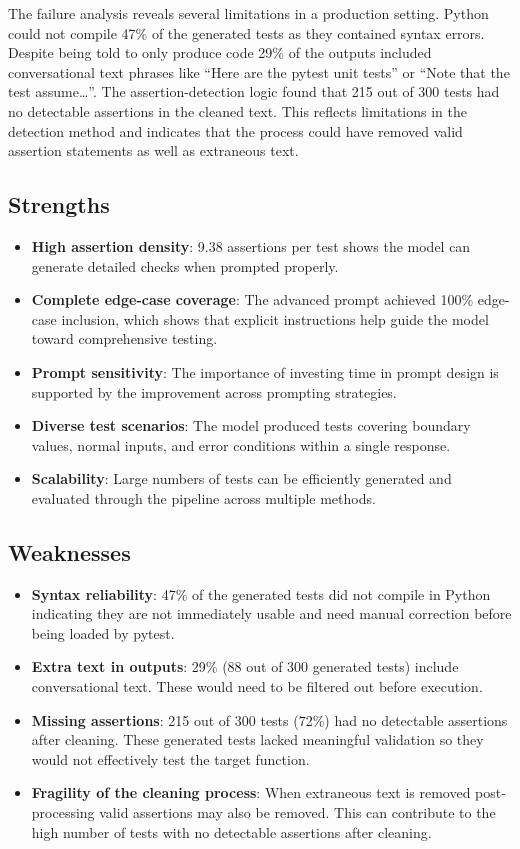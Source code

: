 \documentclass[conference]{IEEEtran}
\begin{document}
The failure analysis reveals several limitations in a production setting. Python could not compile 47\% of the generated tests as they contained syntax errors. Despite being told to only produce code 29\% of the outputs included conversational text phrases like ``Here are the pytest unit tests'' or ``Note that the test assume\ldots''. The assertion-detection logic found that 215 out of 300 tests had no detectable assertions in the cleaned text. This reflects limitations in the detection method and indicates that the process could have removed valid assertion statements as well as extraneous text.

\subsection{Strengths}

\begin{itemize}[leftmargin=*]
    \item \textbf{High assertion density}: 9.38 assertions per test shows the model can generate detailed checks when prompted properly.
    \item \textbf{Complete edge-case coverage}: The advanced prompt achieved 100\% edge-case inclusion, which shows that explicit instructions help guide the model toward comprehensive testing.
    \item \textbf{Prompt sensitivity}: The importance of investing time in prompt design is supported by the improvement across prompting strategies.
    \item \textbf{Diverse test scenarios}: The model produced tests covering boundary values, normal inputs, and error conditions within a single response.
    \item \textbf{Scalability}: 
    Large numbers of tests can be efficiently generated and evaluated through the pipeline across multiple methods.
\end{itemize}

\subsection{Weaknesses}

\begin{itemize}[leftmargin=*]
    \item \textbf{Syntax reliability}: 47\% of the generated tests did not compile in Python indicating they are not immediately usable and need manual correction before being loaded by pytest.
    \item \textbf{Extra text in outputs}: 29\% (88 out of 300 generated tests) include conversational text. These would need to be filtered out before execution.
    \item \textbf{Missing assertions}: 215 out of 300 tests (72\%) had no detectable assertions after cleaning. These generated tests lacked meaningful validation so they would not effectively test the target function.
    \item \textbf{Fragility of the cleaning process}: When extraneous text is removed post-processing valid assertions may also be removed. This can contribute to the high number of tests with no detectable assertions after cleaning.
\end{itemize}
\end{document}
